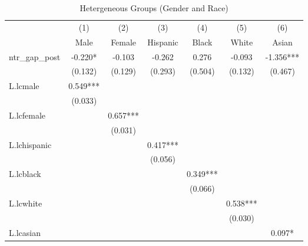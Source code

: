 \documentclass[12pt, final]{CSP}
\begin{document}
\begin{table}[htbp]\centering
\def\sym#1{\ifmmode^{#1}\else\(^{#1}\)\fi}
\caption{Hetergeneous Groups (Gender and Race)}
\begin{tabular}{l*{6}{c}}
\toprule
\hline
\hline
                    &\multicolumn{1}{c}{(1)}   &\multicolumn{1}{c}{(2)}   &\multicolumn{1}{c}{(3)}   &\multicolumn{1}{c}{(4)}   &\multicolumn{1}{c}{(5)}   &\multicolumn{1}{c}{(6)}   \\
&\multicolumn{1}{c}{Male}   &\multicolumn{1}{c}{Female}   &\multicolumn{1}{c}{Hispanic}   &\multicolumn{1}{c}{Black}   &\multicolumn{1}{c}{White}   &\multicolumn{1}{c}{Asian}   \\
\hline
\midrule
ntr\_gap\_post        &   -0.220*  &   -0.103   &   -0.262   &    0.276   &   -0.093   &   -1.356***\\
                    &  (0.132)   &  (0.129)   &  (0.293)   &  (0.504)   &  (0.132)   &  (0.467)   \\
\addlinespace
L.lcmale            &    0.549***&            &            &            &            &            \\
                    &  (0.033)   &            &            &            &            &            \\
\addlinespace
L.lcfemale          &            &    0.657***&            &            &            &            \\
                    &            &  (0.031)   &            &            &            &            \\
\addlinespace
L.lchispanic        &            &            &    0.417***&            &            &            \\
                    &            &            &  (0.056)   &            &            &            \\
\addlinespace
L.lcblack           &            &            &            &    0.349***&            &            \\
                    &            &            &            &  (0.066)   &            &            \\
\addlinespace
L.lcwhite           &            &            &            &            &    0.538***&            \\
                    &            &            &            &            &  (0.030)   &            \\
\addlinespace
L.lcasian           &            &            &            &            &            &    0.097*  \\

\end{tabular}
\end{table}
\end{document}
